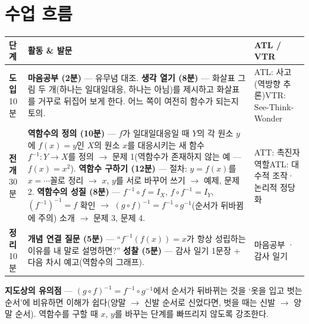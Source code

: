 \documentclass[11pt,a4paper]{article}
\begin{document}
\section{수업 흐름}
\begin{tabularx}{\linewidth}{@{}>{\centering\arraybackslash}p{1.6cm}X>{\raggedright\arraybackslash\small}p{3.1cm}@{}}
\toprule
\textbf{단계} & \textbf{활동 \& 발문} & \textbf{ATL / VTR} \\
\midrule
\textcolor{goldstrong}{\textbf{도입}}\newline\footnotesize 10분 &
\textbf{마음공부 (2분)} --- 유무념 대조.\newline
\textbf{생각 열기 (8분)} --- 화살표 그림 두 개(하나는 일대일대응, 하나는 아님)를 제시하고 화살표를 거꾸로 뒤집어 보게 한다. 어느 쪽이 여전히 함수가 되는지 토의. &
ATL: 사고(역방향 추론)\newline VTR: See-Think-Wonder \\
\addlinespace
\textcolor{goldstrong}{\textbf{전개}}\newline\footnotesize 30분 &
\textbf{역함수의 정의 (10분)} --- $f$가 일대일대응일 때 $Y$의 각 원소 $y$에 $f(x)=y$인 $X$의 원소 $x$를 대응시키는 새 함수 $f^{-1}:Y\to X$를 정의 $\to$ 문제 1(역함수가 존재하지 않는 예 --- $f(x)=x^2$).\newline
\textbf{역함수 구하기 (12분)} --- 절차: $y=f(x)$를 $x=\cdots$꼴로 정리 $\to$ $x$, $y$를 서로 바꾸어 쓰기 $\to$ 예제, 문제 2.\newline
\textbf{역함수의 성질 (8분)} --- $f^{-1}\circ f=I_X$, $f\circ f^{-1}=I_Y$, $(f^{-1})^{-1}=f$ 확인 $\to$ $(g\circ f)^{-1}=f^{-1}\circ g^{-1}$(순서가 뒤바뀜에 주의) 소개 $\to$ 문제 3, 문제 4. &
ATT: 촉진자 역할\newline ATL: 대수적 조작·논리적 정당화 \\
\addlinespace
\textcolor{goldstrong}{\textbf{정리}}\newline\footnotesize 10분 &
\textbf{개념 연결 질문 (5분)} --- ``$f^{-1}(f(x))=x$가 항상 성립하는 이유를 내 말로 설명하면?''\newline
\textbf{성찰 (5분)} --- 감사 일기 1문장 + 다음 차시 예고(역함수의 그래프). &
마음공부 · 감사 일기 \\
\bottomrule
\end{tabularx}

\begin{calloutbox}
\textbf{지도상의 유의점} --- $(g\circ f)^{-1}=f^{-1}\circ g^{-1}$에서 순서가 뒤바뀌는 것을 `옷을 입고 벗는 순서'에 비유하면 이해가 쉽다(양말 $\to$ 신발 순서로 신었다면, 벗을 때는 신발 $\to$ 양말 순서). 역함수를 구할 때 $x$, $y$를 바꾸는 단계를 빠뜨리지 않도록 강조한다.
\end{calloutbox}
\end{document}
